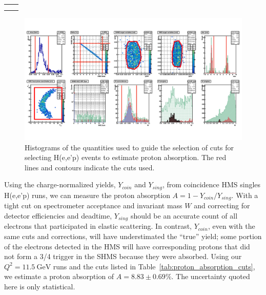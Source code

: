 \begin{table}[h]
{\begin{tabular}[t]{| l | l | l | r | r | r | r | r | r | r | r |}
             \\
        \end{tabular}
    } %
\end{table}
\vfill
\clearpage

\begin{figure}[!h]
    \centering
    \includegraphics[width=1.0\textwidth]{chap4/proton_absorption_plots.pdf}
    \caption{Histograms of the quantities used to guide the selection of cuts
             for selecting H(e,e'p) events to estimate proton absorption.
             The red lines and contours indicate the cuts used.}
    \label{fig:proton_absorption_plots}
\end{figure}

Using the charge-normalized yields, $Y_{coin}$ and $Y_{sing}$, from coincidence
HMS singles H(e,e'p) runs, we can measure the proton absorption
$A=1-Y_{coin}/Y_{sing}$.
With a tight cut on spectrometer acceptance and invariant mass $W$ and
correcting for detector efficiencies and deadtime, $Y_{sing}$ should be an
accurate count of all electrons that participated in elastic scattering.
In contrast, $Y_{coin}$, even with the same cuts and corrections, will have
understimated the ``true'' yield; some portion of the electrons detected in the
HMS will have corresponding protons that did not form a 3/4 trigger in the SHMS
because they were absorbed.
Using our $Q^2 = \SI{11.5}{\giga\electronvolt}$ runs and the cuts listed in
Table~\ref{tab:proton_absorption_cuts}, we estimate a proton absorption of $A=8.83 \pm 0.69 \%$.
The uncertainty quoted here is only statistical.

